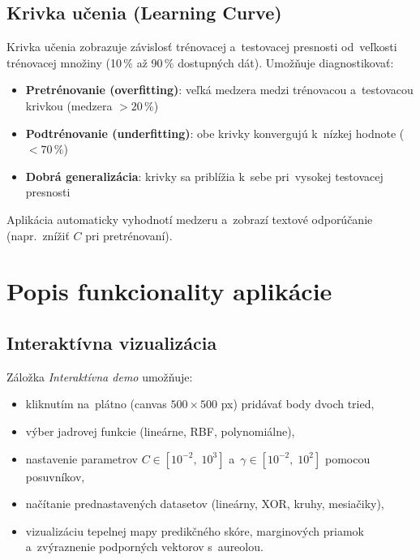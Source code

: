 \documentclass[12pt,a4paper]{article}
\begin{document}
\subsection{Krivka učenia (Learning Curve)}

Krivka učenia zobrazuje závislosť trénovacej a~testovacej presnosti
od~veľkosti trénovacej množiny (10\,\% až 90\,\% dostupných dát).
Umožňuje diagnostikovať:
\begin{itemize}
  \item \textbf{Pretrénovanie (overfitting)}: veľká medzera medzi
    trénovacou a~testovacou krivkou (medzera $> 20\,\%$)
  \item \textbf{Podtrénovanie (underfitting)}: obe krivky konvergujú
    k~nízkej hodnote ($< 70\,\%$)
  \item \textbf{Dobrá generalizácia}: krivky sa priblížia k~sebe
    pri~vysokej testovacej presnosti
\end{itemize}
Aplikácia automaticky vyhodnotí medzeru a~zobrazí textové odporúčanie
(napr.\ znížiť $C$ pri pretrénovaní).

\section{Popis funkcionality aplikácie}

\subsection{Interaktívna vizualizácia}

Záložka \emph{Interaktívna demo} umožňuje:
\begin{itemize}
  \item kliknutím na~plátno (canvas $500 \times 500$ px) pridávať body
    dvoch tried,
  \item výber jadrovej funkcie (lineárne, RBF, polynomiálne),
  \item nastavenie parametrov $C \in [10^{-2},\; 10^{3}]$
    a~$\gamma \in [10^{-2},\; 10^{2}]$ pomocou posuvníkov,
  \item načítanie prednastavených datasetov (lineárny, XOR, kruhy,
    mesiačiky),
  \item vizualizáciu tepelnej mapy predikčného skóre, marginových
    priamok a~zvýraznenie podporných vektorov s~aureolou.
\end{itemize}
\end{document}
